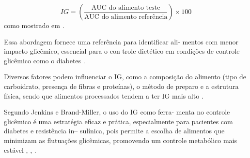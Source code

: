 \documentclass[conference]{IEEEtran}
\begin{document}
\begin{equation*}
IG = \left(\frac{\text{AUC do alimento teste}}{\text{AUC do alimento referência}}\right)\times100 
\end{equation*} como mostrado em \cite{b4}.
\par
Essa abordagem fornece uma referência para identificar ali-
mentos com menor impacto glicêmico, essencial para o con
trole dietético em condições de controle glicêmico como o 
diabetes \cite{b4}. 
\par
Diversos fatores podem influenciar o IG, como 
a composição do alimento (tipo de carboidrato, presença de 
fibras e proteínas), o método de preparo e a estrutura física, 
sendo que alimentos processados tendem a ter IG mais alto 
\cite{b28}. 
\par
Segundo Jenkins e Brand-Miller, o uso do  IG como ferra-
menta no controle glicêmico é uma estratégia eficaz e prática, 
especialmente para pacientes com diabetes e  resistência in--
sulínica, pois permite a escolha de alimentos que minimizam 
as flutuações glicêmicas, promovendo um controle metabólico 
mais estável \cite{b4}, \cite{b27}, \cite{b28}.
\fussy
\end{document}
